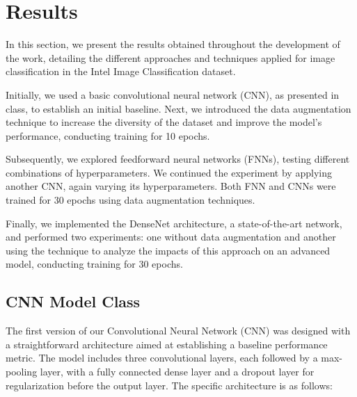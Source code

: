 \section{Results}

In this section, we present the results obtained throughout the development of the work, detailing the different approaches and techniques applied for image classification in the Intel Image Classification dataset.

Initially, we used a basic convolutional neural network (CNN), as presented in class, to establish an initial baseline. Next, we introduced the data augmentation technique to increase the diversity of the dataset and improve the model's performance, conducting training for 10 epochs.

Subsequently, we explored feedforward neural networks (FNNs), testing different combinations of hyperparameters. We continued the experiment by applying another CNN, again varying its hyperparameters. Both FNN and CNNs were trained for 30 epochs using data augmentation techniques.

Finally, we implemented the DenseNet architecture, a state-of-the-art network, and performed two experiments: one without data augmentation and another using the technique to analyze the impacts of this approach on an advanced model, conducting training for 30 epochs.

\subsection{CNN Model Class}

The first version of our Convolutional Neural Network (CNN) was designed with a straightforward architecture aimed at establishing a baseline performance metric. The model includes three convolutional layers, each followed by a max-pooling layer, with a fully connected dense layer and a dropout layer for regularization before the output layer. The specific architecture is as follows:

